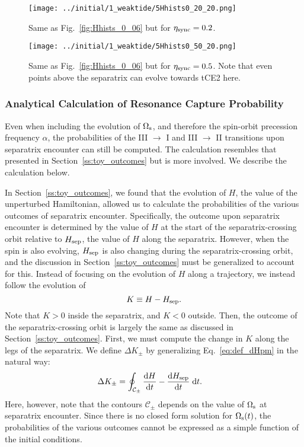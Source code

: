 \documentclass[
        fleqn,
        usenatbib,
    ]{mnras}
\newcommand*{\rd}[2]{\frac{\mathrm{d}#1}{\mathrm{d}#2}}
\begin{document}
\begin{figure}
    \centering
    \texttt{[image: ../initial/1\_weaktide/5Hhists0\_20\_20.png]}
    \caption{Same as Fig.~\ref{fig:Hhists_0_06} but for $\eta_{\rm sync} =
    0.2$.}\label{fig:Hhists_0_20}
\end{figure}
\begin{figure}
    \centering
    \texttt{[image: ../initial/1\_weaktide/5Hhists0\_50\_20.png]}
    \caption{Same as Fig.~\ref{fig:Hhists_0_06} but for $\eta_{\rm sync} =
    0.5$. Note that even points above the separatrix can evolve towards tCE2
    here.}\label{fig:Hhists_0_70}
\end{figure}

\subsubsection{Analytical Calculation of Resonance Capture Probability
}\label{ss:phop_weaktide}

Even when including the evolution of $\Omega_{\rm s}$, and therefore the
spin-orbit precession frequency $\alpha$, the probabilities of the III $\to$ I
and III $\to$ II transitions upon separatrix encounter can still be computed.
The calculation resembles that presented in Section~\ref{ss:toy_outcomes} but is
more involved. We describe the calculation below.

In Section~\ref{ss:toy_outcomes}, we found that the evolution of $H$, the value
of the unperturbed Hamiltonian, allowed us to calculate the probabilities of the
various outcomes of separatrix encounter. Specifically, the outcome upon
separatrix encounter is determined by the value of $H$ at the start of the
separatrix-crossing orbit relative to $H_{\rm sep}$, the value of $H$ along the
separatrix. However, when the spin is also evolving, $H_{\rm sep}$ is also
changing during the separatrix-crossing orbit, and the discussion in
Section~\ref{ss:toy_outcomes} must be generalized to account for this. Instead
of focusing on the evolution of $H$ along a trajectory, we instead follow the
evolution of
\begin{equation}
    K \equiv H - H_{\rm sep}.
\end{equation}
Note that $K > 0$ inside the separatrix, and $K < 0$ outside. Then, the outcome
of the separatrix-crossing orbit is largely the same as discussed in
Section~\ref{ss:toy_outcomes}. First, we must compute the change in $K$ along
the legs of the separatrix. We define $\Delta K_{\pm}$ by generalizing
Eq.~\eqref{eq:def_dHpm} in the natural way:
\begin{align}
    \Delta K_{\pm} &= \oint_{\mathcal{C}_{\pm}} \rd{H}{t}
        - \rd{H_{\rm sep}}{t}\;\mathrm{d}t.\label{eq:def_dK_weaktide}
\end{align}
Here, however, note that the contours $\mathcal{C}_{\pm}$ depends on the value
of $\Omega_{\rm s}$ at separatrix encounter. Since there is no closed form
solution for $\Omega_{\rm s}(t)$, the probabilities of the various outcomes
cannot be expressed as a simple function of the initial conditions.
\end{document}
